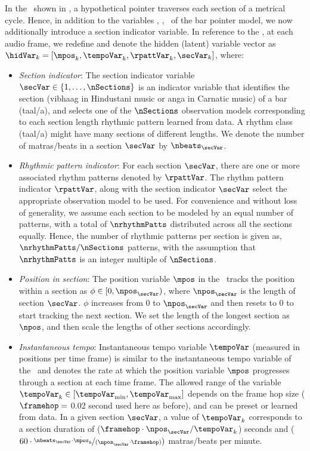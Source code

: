 In the \spmodel\ shown in , a hypothetical pointer traverses each section of a metrical cycle. Hence, in addition to the variables \mpos, \tempoVar, \rpattVar\ of the bar pointer model, we now additionally introduce a section indicator variable. In reference to the \spmodel, at each audio frame, we redefine and denote the hidden (latent) variable vector as $\hidVar_k = [\mpos_k, \tempoVar_k, \rpattVar_k, \secVar_k]$, where: 
\begin{itemize}[leftmargin=*]
\item \textit{Section indicator}: The section indicator variable $\secVar \in \lbrace 1, \ldots, \nSections \rbrace$ is an indicator variable that identifies the section (\gls{vibhaag} in Hindustani music or \gls{anga} in Carnatic music) of a bar (\gls{taal}/a), and selects one of the $\nSections$ observation models corresponding to each section length rhythmic pattern learned from data. A rhythm class (\gls{taal}/a) might have many sections of different lengths. We denote the number of \glspl{matra}/beats in a section $\secVar$ by $\nbeats_\secVar$. 
%
\item \textit{Rhythmic pattern indicator}: For each section $\secVar$, there are one or more associated rhythm patterns denoted by $\rpattVar$. The rhythm pattern indicator $\rpattVar$, along with the section indicator $\secVar$ select the appropriate observation model to be used. For convenience and without loss of generality, we assume each section to be modeled by an equal number of patterns, with a total of $\nrhythmPatts$ distributed across all the sections equally. Hence, the number of rhythmic patterns per section is given as, $\nrhythmPatts/\nSections$ patterns, with the assumption that $\nrhythmPatts$ is an integer multiple of $\nSections$. 
%
\item \textit{Position in section}: The position variable $\mpos$ in the \spmodel\ tracks the position within a section as $\phi \in [0, \npos_\secVar)$, where $\npos_\secVar$ is the length of section $\secVar$. $\phi$ increases from $0$ to $\npos_\secVar$ and then resets to $0$ to start tracking the next section. We set the length of the longest section as $\npos$, and then scale the lengths of other sections accordingly. 
%
\item \textit{Instantaneous tempo}: Instantaneous tempo variable $\tempoVar$ (measured in positions per time frame) is similar to the instantaneous tempo variable of the \bpmodel\ and denotes the rate at which the position variable $\mpos$ progresses through a section at each time frame. The allowed range of the variable $\tempoVar_k \in [\tempoVar_{\min}, \tempoVar_{\max}]$ depends on the frame hop size ($\framehop = $ 0.02 second used here as before), and can be preset or learned from data. In a given section $\secVar$, a value of $\tempoVar_{k}$ corresponds to a section duration of ($\framehop \cdot \npos_\secVar / \tempoVar_{k}$) seconds and ($60 \cdot \nicefrac{\nbeats_\secVar\cdot\dot\mpos_k}{(\npos_\secVar \cdot\framehop)})$ \glspl{matra}/beats per minute. 
\end{itemize}

